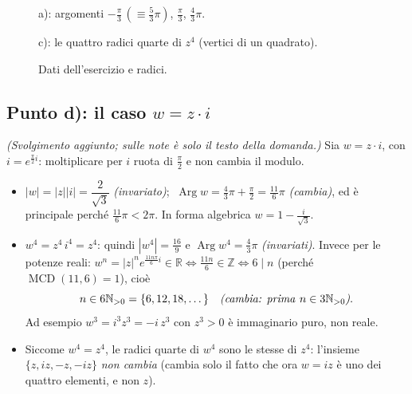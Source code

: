 \documentclass[11pt,a4paper]{article}
\newcommand{\RR}{\mathbb{R}}
\newcommand{\ZZ}{\mathbb{Z}}
\newcommand{\NN}{\mathbb{N}}
\newcommand{\Arg}{\operatorname{Arg}}
\newcommand{\MCD}{\operatorname{MCD}}
\theoremstyle{plain}
\theoremstyle{definition}
\theoremstyle{remark}
\begin{document}
\begin{figure}[h]
\centering
\begin{minipage}{0.48\textwidth}
\centering
{}

\small a): argomenti $-\frac\pi3\,(\equiv\frac53\pi)$, $\frac\pi3$, $\frac43\pi$.
\end{minipage}\hfill
\begin{minipage}{0.48\textwidth}
\centering
{}

\small c): le quattro radici quarte di $z^4$ (vertici di un quadrato).
\end{minipage}
\caption{Dati dell'esercizio e radici.}
\end{figure}

\subsection{Punto d): il caso $w=z\cdot i$}

\emph{(Svolgimento aggiunto; sulle note è solo il testo della domanda.)}
Sia $w=z\cdot i$, con $i=e^{\frac\pi2 i}$: moltiplicare per $i$ ruota di $\frac\pi2$ e non cambia il modulo.
\begin{itemize}[leftmargin=*]
  \item[a)] $|w|=|z||i|=\dfrac2{\sqrt3}$ \emph{(invariato)}; $\ \Arg w=\frac43\pi+\frac\pi2=\frac{11}6\pi$ \emph{(cambia)}, ed è principale perché $\frac{11}6\pi<2\pi$.
  In forma algebrica $w=1-\frac{i}{\sqrt3}$.
  \item[b)] $w^4=z^4\,i^4=z^4$: quindi $|w^4|=\frac{16}9$ e $\Arg w^4=\frac43\pi$ \emph{(invariati)}.
  Invece per le potenze reali: $w^n=|z|^n e^{\frac{11n\pi}{6}i}\in\RR\iff\frac{11n}6\in\ZZ\iff6\mid n$ (perché $\MCD(11,6)=1$), cioè
  \[
    n\in6\NN_{>0}=\{6,12,18,\dots\}\quad\text{\emph{(cambia: prima }}n\in3\NN_{>0}\text{\emph{)}}.
  \]
  Ad esempio $w^3=i^3z^3=-i\,z^3$ con $z^3>0$ è immaginario puro, non reale.
  \item[c)] Siccome $w^4=z^4$, le radici quarte di $w^4$ sono le stesse di $z^4$: l'insieme $\{z,iz,-z,-iz\}$ \emph{non cambia}
  (cambia solo il fatto che ora $w=iz$ è uno dei quattro elementi, e non $z$).
\end{itemize}
\end{document}
